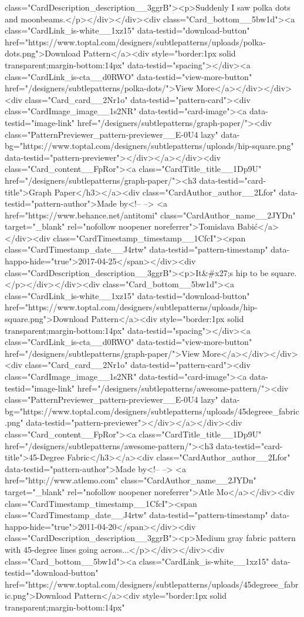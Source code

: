 class="CardDescription_description__3ggrB"><p>Suddenly I saw polka dots and moonbeams.</p></div></div><div class="Card_bottom__5bw1d"><a class="CardLink_is-white__1xz15" data-testid="download-button" href="https://www.toptal.com/designers/subtlepatterns/uploads/polka-dots.png">Download Pattern</a><div style="border:1px solid transparent;margin-bottom:14px" data-testid="spacing"></div><a class="CardLink_is-cta__d0RWO" data-testid="view-more-button" href="/designers/subtlepatterns/polka-dots/">View More</a></div></div><div class="Card_card__2Nr1o" data-testid="pattern-card"><div class="CardImage_image__1s2NR" data-testid="card-image"><a data-testid="image-link" href="/designers/subtlepatterns/graph-paper/"><div class="PatternPreviewer_pattern-previewer__E-0U4 lazy" data-bg="https://www.toptal.com/designers/subtlepatterns/uploads/hip-square.png" data-testid="pattern-previewer"></div></a></div><div class="Card_content__FpRor"><a class="CardTitle_title__1Dp9U" href="/designers/subtlepatterns/graph-paper/"><h3 data-testid="card-title">Graph Paper</h3></a><div class="CardAuthor_author__2Lfor" data-testid="pattern-author">Made by<!-- --> <a href="https://www.behance.net/antitomi" class="CardAuthor_name__2JYDn" target="_blank" rel="nofollow noopener noreferrer">Tomislava Babić</a></div><div class="CardTimestamp_timestamp__1CfcI"><span class="CardTimestamp_date__J4rtw" data-testid="pattern-timestamp" data-happo-hide="true">2017-04-25</span></div><div class="CardDescription_description__3ggrB"><p>It&#x27;s hip to be square.</p></div></div><div class="Card_bottom__5bw1d"><a class="CardLink_is-white__1xz15" data-testid="download-button" href="https://www.toptal.com/designers/subtlepatterns/uploads/hip-square.png">Download Pattern</a><div style="border:1px solid transparent;margin-bottom:14px" data-testid="spacing"></div><a class="CardLink_is-cta__d0RWO" data-testid="view-more-button" href="/designers/subtlepatterns/graph-paper/">View More</a></div></div><div class="Card_card__2Nr1o" data-testid="pattern-card"><div class="CardImage_image__1s2NR" data-testid="card-image"><a data-testid="image-link" href="/designers/subtlepatterns/awesome-pattern/"><div class="PatternPreviewer_pattern-previewer__E-0U4 lazy" data-bg="https://www.toptal.com/designers/subtlepatterns/uploads/45degreee_fabric.png" data-testid="pattern-previewer"></div></a></div><div class="Card_content__FpRor"><a class="CardTitle_title__1Dp9U" href="/designers/subtlepatterns/awesome-pattern/"><h3 data-testid="card-title">45-Degree Fabric</h3></a><div class="CardAuthor_author__2Lfor" data-testid="pattern-author">Made by<!-- --> <a href="http://www.atlemo.com" class="CardAuthor_name__2JYDn" target="_blank" rel="nofollow noopener noreferrer">Atle Mo</a></div><div class="CardTimestamp_timestamp__1CfcI"><span class="CardTimestamp_date__J4rtw" data-testid="pattern-timestamp" data-happo-hide="true">2011-04-20</span></div><div class="CardDescription_description__3ggrB"><p>Medium gray fabric pattern with 45-degree lines going across...</p></div></div><div class="Card_bottom__5bw1d"><a class="CardLink_is-white__1xz15" data-testid="download-button" href="https://www.toptal.com/designers/subtlepatterns/uploads/45degreee_fabric.png">Download Pattern</a><div style="border:1px solid transparent;margin-bottom:14px" 